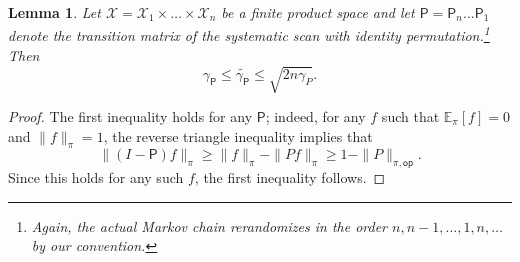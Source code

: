 \documentclass[10pt,a4paper]{article}
\newtheorem{lemma}{Lemma}[section]
\begin{document}
\begin{lemma}
\label{lem:gibbs_comp}
    Let $\mathcal{X}=\mathcal{X}_1\times\ldots\times \mathcal{X}_n$ be a finite product space and let $\mathsf{P}=\mathsf{P}_n\ldots \mathsf{P}_1$ denote the transition matrix of the systematic scan with identity permutation.\footnote{Again, the actual Markov chain rerandomizes in the order $n,n-1,\ldots,1,n,\ldots$ by our convention.} Then
    \begin{equation*}
        \gamma_{\mathsf{P}}\leq \widetilde{\gamma_{\mathsf{P}}}\leq \sqrt{2n\gamma_{P}}.
    \end{equation*}
\end{lemma}

\begin{proof}
    The first inequality holds for any $\mathsf{P}$; indeed, for any $f$ such that $\mathbb{E}_{\pi}[f]=0$ and $\|f\|_{\pi}=1$, the reverse triangle inequality implies that
    \begin{equation*}
\|(I-\mathsf{P})f\|_{\pi}\geq \|f\|_{\pi}-\|Pf\|_{\pi}\geq 1-\|P\|_{\pi,\mathsf{op}}.
    \end{equation*}
    Since this holds for any such $f$, the first inequality follows.


\end{proof}
\end{document}
